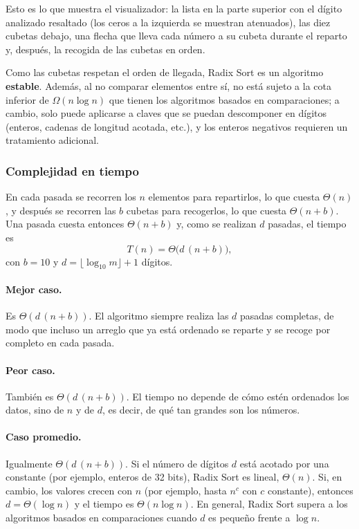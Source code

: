 \documentclass[11pt,letterpaper]{article}
\begin{document}
Esto es lo que muestra el visualizador: la lista en la parte superior con el dígito analizado resaltado (los ceros a la izquierda se muestran atenuados), las diez cubetas debajo, una flecha que lleva cada número a su cubeta durante el reparto y, después, la recogida de las cubetas en orden.

Como las cubetas respetan el orden de llegada, Radix Sort es un algoritmo \textbf{estable}. Además, al no comparar elementos entre sí, no está sujeto a la cota inferior de $\Omega(n \log n)$ que tienen los algoritmos basados en comparaciones; a cambio, solo puede aplicarse a claves que se puedan descomponer en dígitos (enteros, cadenas de longitud acotada, etc.), y los enteros negativos requieren un tratamiento adicional.

\subsubsection{Complejidad en tiempo}

En cada pasada se recorren los $n$ elementos para repartirlos, lo que cuesta $\Theta(n)$, y después se recorren las $b$ cubetas para recogerlos, lo que cuesta $\Theta(n + b)$. Una pasada cuesta entonces $\Theta(n + b)$ y, como se realizan $d$ pasadas, el tiempo es
\[
  T(n) = \Theta\bigl(d\,(n + b)\bigr),
\]
con $b = 10$ y $d = \lfloor \log_{10} m \rfloor + 1$ dígitos.

\paragraph{Mejor caso.} Es $\Theta(d\,(n + b))$. El algoritmo siempre realiza las $d$ pasadas completas, de modo que incluso un arreglo que ya está ordenado se reparte y se recoge por completo en cada pasada.

\paragraph{Peor caso.} También es $\Theta(d\,(n + b))$. El tiempo no depende de cómo estén ordenados los datos, sino de $n$ y de $d$, es decir, de qué tan grandes son los números.

\paragraph{Caso promedio.} Igualmente $\Theta(d\,(n + b))$. Si el número de dígitos $d$ está acotado por una constante (por ejemplo, enteros de 32 bits), Radix Sort es lineal, $\Theta(n)$. Si, en cambio, los valores crecen con $n$ (por ejemplo, hasta $n^c$ con $c$ constante), entonces $d = \Theta(\log n)$ y el tiempo es $\Theta(n \log n)$. En general, Radix Sort supera a los algoritmos basados en comparaciones cuando $d$ es pequeño frente a $\log n$.
\end{document}
